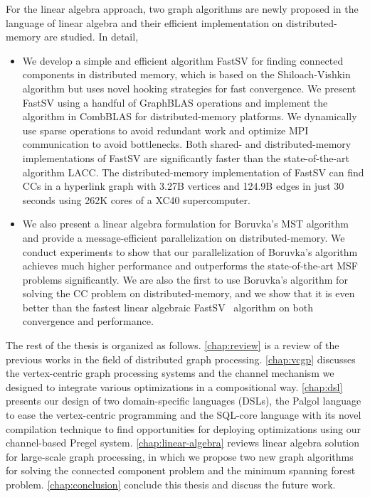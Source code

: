 \documentclass{sokendai_thesis} %
\newcommand{\boruvka}[0]{Boruvka}
\begin{document}
For the linear algebra approach, two graph algorithms are newly proposed in the language of linear algebra and their efficient implementation on distributed-memory are studied. In detail,
\begin{itemize}
\item
  We develop a simple and efficient algorithm FastSV for finding connected components in distributed memory, which is based on the Shiloach-Vishkin algorithm but uses novel hooking strategies for fast convergence.
  We present FastSV using a handful of GraphBLAS operations and implement the algorithm in CombBLAS for distributed-memory platforms.
  We dynamically use sparse operations to avoid redundant work and optimize MPI communication to avoid bottlenecks.
  Both shared- and distributed-memory implementations of FastSV are significantly faster than the state-of-the-art algorithm LACC.
  The distributed-memory implementation of FastSV can find CCs in a hyperlink graph with 3.27B vertices and 124.9B edges in just $30$ seconds using 262K cores of a XC40 supercomputer. 

\item
  We also present a linear algebra formulation for \boruvka{}'s MST algorithm and provide a message-efficient parallelization on distributed-memory.
  We conduct experiments to show that our parallelization of \boruvka{}'s algorithm achieves much higher performance and outperforms the state-of-the-art MSF problems significantly.
  We are also the first to use \boruvka{}'s algorithm for solving the CC problem on distributed-memory, and we show that it is even better than the fastest linear algebraic FastSV~\cite{fastsv} algorithm on both convergence and performance.

\end{itemize}

The rest of the thesis is organized as follows.
\autoref{chap:review} is a review of the previous works in the field of distributed graph processing.
\autoref{chap:vcgp} discusses the vertex-centric graph processing systems and the channel mechanism we designed to integrate various optimizations in a compositional way.
\autoref{chap:dsl} presents our design of two domain-specific languages (DSLs), the Palgol language to ease the vertex-centric programming and the SQL-core language with its novel compilation technique to find opportunities for deploying optimizations using our channel-based Pregel system.
\autoref{chap:linear-algebra} reviews linear algebra solution for large-scale graph processing, in which we propose two new graph algorithms for solving the connected component problem and the minimum spanning forest problem.
\autoref{chap:conclusion} conclude this thesis and discuss the future work.
\end{document}
